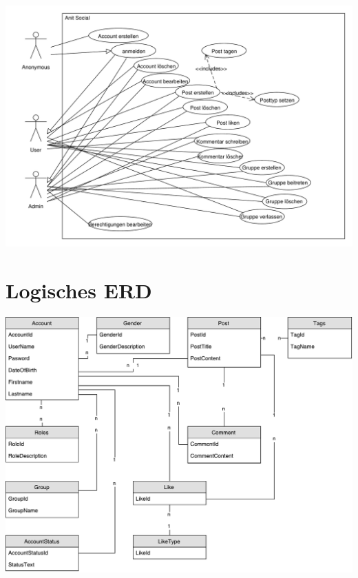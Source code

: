 \documentclass[12pt,twoside,a4paper]{article}
\begin{document}
	\includegraphics[width=15cm]{ucprj}
	
	\section{Logisches ERD}
	\includegraphics[width=15cm]{erd_a}
	
	
	
\end{document}
